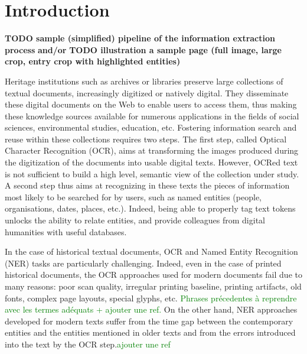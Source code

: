 \section{Introduction}

\textbf{TODO sample (simplified) pipeline of the information extraction process}
\textbf{and/or}
\textbf{TODO illustration a sample page (full image, large crop, entry crop with highlighted entities)}


Heritage institutions such as archives or libraries preserve large collections of textual documents, increasingly digitized or natively digital. They disseminate these digital documents on the Web to enable users to access them, thus making these knowledge sources available for numerous applications in the fields of social sciences, environmental studies, education, etc. Fostering information search and reuse within these collections requires two steps. The first step, called Optical Character Recognition (OCR), aims at transforming the images produced during the digitization of the documents into usable digital texts. However, OCRed text is not sufficient to build a high level, semantic view of the collection under study. A second step thus aims at recognizing in these texts the pieces of information most likely to be searched for by users, such as named entities (people, organisations, dates, places, etc.). Indeed, being able to properly tag text tokens unlocks the ability to relate entities, and provide colleagues from digital humanities with useful databases.

In the case of historical textual documents, OCR and Named Entity Recognition (NER) tasks are particularly challenging. Indeed, even in the case of printed historical documents, the OCR approaches used for modern documents fail due to many reasons: poor scan quality, irregular printing baseline, printing artifacts, old fonts, complex page layouts, special glyphs, etc. \textcolor{green}{Phrases précedentes à reprendre avec les termes adéquats + ajouter une ref.} On the other hand, NER approaches developed for modern texts suffer from the time gap between the contemporary entities and the entities mentioned in older texts and from the errors introduced into the text by the OCR step.\textcolor{green}{ajouter une ref}

